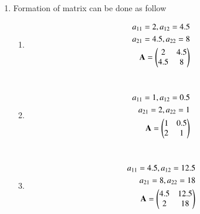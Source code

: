 \renewcommand{\theequation}{\theenumi}
\begin{enumerate}[label=\arabic*.,ref=\thesubsection.\theenumi]

\item Formation of matrix can be done as follow
\begin{enumerate}
	\item 
	\begin{align}
	a_{11} = 2		,	a_{12} = 4.5
	\\
	a_{21} =4.5		,	a_{22} = 8
	\\
	\mathbf A = \begin{pmatrix}2 & 4.5\\4.5 & 8\end{pmatrix}
	\end{align}
	\\
	\item 
	\begin{align}
	a_{11} = 1		,	a_{12} = 0.5
	\\
	a_{21} =2		,	a_{22} = 1
	\\
	\mathbf A = \begin{pmatrix}1 & 0.5\\2 & 1\end{pmatrix}
	\end{align}
	\\
	\item 
	\begin{align}
	a_{11} = 4.5	,	a_{12} = 12.5
	\\
	a_{21} =8		,	a_{22} = 18
	\\
	\mathbf A = \begin{pmatrix}4.5 & 12.5\\2 & 18\end{pmatrix}
	\end{align}
\end{enumerate}
\end{enumerate}